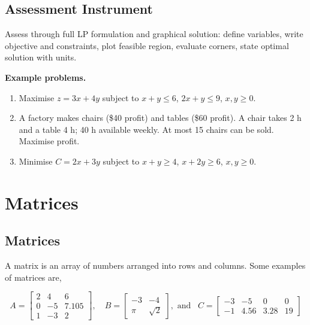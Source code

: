 \subsection{Assessment Instrument}
\label{ssec:asse-3669}


Assess through full LP formulation and graphical solution: define
variables, write objective and constraints, plot feasible region, evaluate
corners, state optimal solution with units.

\textbf{Example problems.}
\begin{enumerate}
    \item Maximise $z=3x+4y$ subject to $x+y\leq6$, $2x+y\leq9$,
          $x,y\geq0$.
    \item A factory makes chairs (\$40 profit) and tables (\$60 profit).
          A chair takes 2 h and a table 4 h; 40 h available weekly.
          At most 15 chairs can be sold. Maximise profit.
    \item Minimise $C=2x+3y$ subject to $x+y\geq4$, $x+2y\geq6$,
          $x,y\geq0$.
\end{enumerate}



\section{Matrices}
\label{sec:matr-25b2}



\subsection{Matrices}
\label{sss:matr-25b2}

A matrix is an array of numbers arranged into rows and columns. Some examples of matrices are,

$$
A=
\begin{bmatrix}
2 & 4 & 6 \\ 0 & -5 & 7.105 \\ 1 & -3 & 2
\end{bmatrix}
,\quad
B=
\begin{bmatrix}
	-3 & -4 \\ \pi & \sqrt{2}
\end{bmatrix}
,\text{ and }\,\,\,
C=
\begin{bmatrix}
	-3 & -5 & 0 & 0 \\ -1 & 4.56 & 3.28 & 19
\end{bmatrix}
$$



